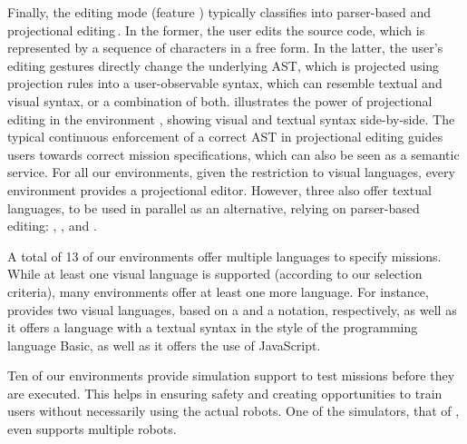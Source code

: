 Finally, the editing mode (feature \feditingmode) typically classifies into parser-based and projectional editing\,\cite{voelter2014projectional,berger2016pe}. In the former, the user edits the source code, which is represented by a sequence of characters in a free form. In the latter, the user's editing gestures directly change the underlying AST, which is projected using projection rules into a user-observable syntax, which can resemble textual and visual syntax, or a combination of both.  illustrates the power of projectional editing in the environment \easyc, showing visual and textual syntax side-by-side. The typical continuous enforcement of a correct AST in projectional editing guides users towards correct mission specifications, which can also be seen as a semantic service. For all our environments, given the restriction to visual languages, every environment provides a projectional editor. However, three also offer textual languages, to be used in parallel as an alternative, relying on parser-based editing: \aseba, \vex, and \turtlebot.%

 A total of 13 of our environments offer multiple languages to specify missions. While at least one visual language is supported (according to our selection criteria), many environments offer at least one more language. For instance, \picaxe provides two visual languages, based on a \fflowchart and a \fblockly notation, respectively, as well as it offers a language with a textual syntax in the style of the programming language Basic, as well as it offers the use of JavaScript.



 Ten of our environments provide simulation support to test missions before they are executed. This helps in ensuring safety and creating opportunities to train users without necessarily using the actual robots. One of the simulators, that of \missionlab, even supports multiple robots.

